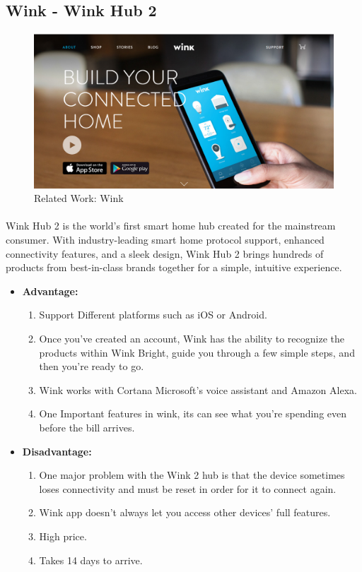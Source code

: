 \documentclass[12pt, oneside, a4paper]{book}
\newcommand\boldcolor[1]{\textcolor{bold}{\textbf{#1}}}
\begin{document}
		\subsection{Wink - Wink Hub 2}
		\begin{figure}[H]
  			\caption{Related Work: Wink}
  			\includegraphics[width=\linewidth]{img/wink.png}
		\end{figure}
		\paragraph{}Wink Hub 2 is the world’s first smart home hub created for the mainstream consumer. With industry-leading smart home protocol support, enhanced connectivity features, and a sleek design, Wink Hub 2 brings hundreds of products from best-in-class brands together for a simple, intuitive experience\cite{wink}.
		
		\begin{itemize}
			\item \boldcolor{Advantage:}
			\begin{enumerate}
				\item Support Different platforms such as iOS or Android.
				\item Once you've created an account, Wink has the ability to recognize the products within Wink Bright, guide you through a few simple steps, and then you're ready to go.
				\item Wink works with Cortana Microsoft’s voice assistant and Amazon Alexa.
				\item One Important features in wink, its can see what you’re spending even before the bill arrives.
			\end{enumerate}
			\item \boldcolor{Disadvantage:} 
			\begin{enumerate}
				\item One major problem with the Wink 2 hub is that the device sometimes loses connectivity and must be reset in order for it to connect again.
				\item Wink app doesn't always let you access other devices' full features.
				\item High price.
				\item Takes 14 days to arrive.
			\end{enumerate}
		\end{itemize}
		\newpage
\end{document}
